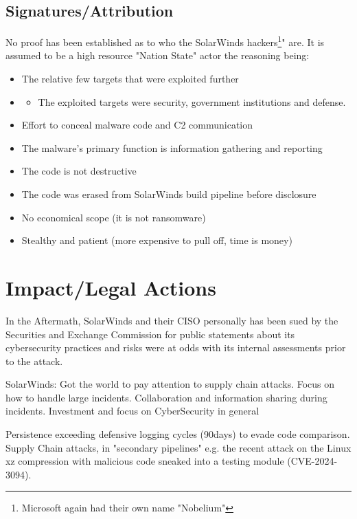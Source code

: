 \documentclass[
	letterpaper, %
	10pt, %
	unnumberedsections, %
	twoside, %
]{LTJournalArticle}
\begin{document}
\subsection{Signatures/Attribution}
No proof has been established as to who the SolarWinds hackers\footnote{Microsoft again had their own name "Nobelium"}" are.
It is assumed to be a high resource "Nation State" actor the reasoning being:
\begin{itemize}
	\item The relative few targets that were exploited further
	\item \begin{itemize}
		\item The exploited targets were security, government institutions  and defense.
	\end{itemize}
	\item Effort to conceal malware code and C2 communication
	\item The malware's primary function is information gathering and reporting
	\item The code is not destructive
	\item The code was erased from SolarWinds build pipeline before disclosure
	\item No economical scope (it is not ransomware)
	\item Stealthy and patient (more expensive to pull off, time is money)
\end{itemize} 



\section{Impact/Legal Actions} 
In the Aftermath, SolarWinds and their CISO personally has been sued by the Securities and Exchange Commission\cite{SECLawsuit} for public statements about its cybersecurity practices and risks were at odds with its internal assessments prior to the attack.

SolarWinds: 
Got the world to pay attention to supply chain attacks. 
Focus on how to handle large incidents.
Collaboration and information sharing during incidents.
Investment and focus on CyberSecurity in general



Persistence exceeding defensive logging cycles (90days) to evade code comparison.
Supply Chain attacks, in "secondary pipelines" e.g. the recent attack on the Linux xz compression with malicious code sneaked into a testing module (CVE-2024-3094).
\end{document}
